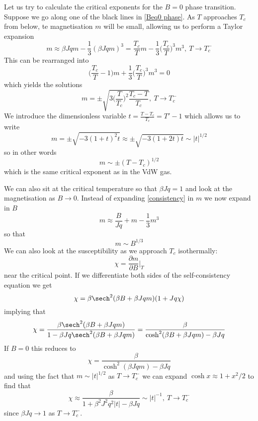 \documentclass[a4paper,11pt,oneside]{book}
\begin{document}
Let us try to calculate the critical exponents for the $B=0$ phase transition. Suppose we go along one of the black lines in \ref{Beq0 phase}. As $T$ approaches $T_c$ from below, te magnetisation $m$ will be small, allowing us to perform a Taylor expansion
\begin{equation}
    m \approx \beta J qm -\frac{1}{3}(\beta J qm)^3 = \frac{T_c}{T}m - \frac{1}{3}\bigg(\frac{T_c}{T}\bigg)^3m^3, \ T \rightarrow T_c^{-}
\end{equation}
This can be rearranged into
\begin{equation}
  \bigg(\frac{T_c}{T}-1\bigg)m  + \frac{1}{3}\bigg(\frac{T_c}{T}\bigg)^3 m^3 = 0
\end{equation}
which yields the solutions
\begin{equation}
    m = \pm \sqrt{3\bigg(\frac{T}{T_c}\bigg)^2\frac{T_c-T}{T_c}}, \ T \rightarrow T_c^{-}
\end{equation}
We introduce the dimensionless variable $t=\frac{T-T_c}{T_c}=T'-1$ which allows us to write
\begin{equation}
   m = \pm \sqrt{-3(1+t)^2t} \approx \pm \sqrt{-3(1+2t)t} \sim |t|^{1/2}
\end{equation}
so in other words
\begin{equation}
    m \sim \pm (T-T_c)^{1/2}
\end{equation}
which is the same critical exponent as in the VdW gas.

We can also sit at the critical temperature so that $\beta Jq=1$ and look at the magnetisation as $B \rightarrow 0$. Instead of expanding \eqref{consistency} in $m$ we now expand in $B$
\begin{equation}
    m \approx \frac{B}{Jq} + m - \frac{1}{3}m^3
\end{equation}
so that
\begin{equation}
    m \sim B^{1/3}
\end{equation}
We can also look at the susceptibility as we approach $T_c$ isothermally:
\begin{equation}
    \chi = \frac{\partial m}{\partial B}\bigg|_{T}
\end{equation}
near the critical point. If we differentiate both sides of the self-consistency equation we get
\begin{equation}
    \chi = \beta\sech^2(\beta B + \beta Jqm)(1+Jq\chi)
\end{equation}
implying that
\begin{equation}
    \chi = \frac{\beta \sech^2(\beta B + \beta Jqm)}{1-\beta Jq \sech^2(\beta B + \beta Jqm)} = \frac{\beta}{\cosh^2(\beta B + \beta Jqm)-\beta Jq}
\end{equation}
If $B=0$ this reduces to
\begin{equation}
    \chi = \frac{\beta}{\cosh^2(\beta Jqm)-\beta Jq}
\end{equation}
and using the fact that $m \sim |t|^{1/2}$ as $T \rightarrow T_c^-$ we can expand $\cosh x \approx 1+x^2/2$ to find that
\begin{equation}
    \chi \approx \frac{\beta}{1+\beta^2 J^2 q^2 |t|-\beta J q} \sim |t|^{-1}, \ T \rightarrow T_c^-
\end{equation}
since $\beta J q \rightarrow 1$ as $T \rightarrow T_c^-$.
\end{document}

